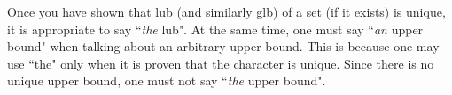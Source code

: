 \hrulefill


\hrulefill

Once you have shown that lub (and similarly glb) of a set (if it exists) is unique, it is appropriate to say ``\textit{the} lub". At the same time, one must say ``\textit{an} upper bound" when talking about an arbitrary upper bound. This is because one may use ``the" only when it is proven that the character is unique. Since there is no unique upper bound, one must not say ``\textit{the} upper bound".